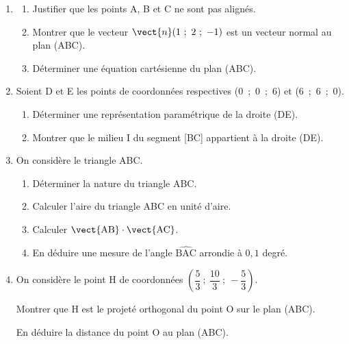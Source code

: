 \begin{enumerate}
\item 
	\begin{enumerate}
		\item Justifier que les points A, B et C ne sont pas alignés.
		\item Montrer que le vecteur $\vect{n}(1~;~2~;~-1)$ est
un vecteur normal au plan (ABC).
		\item Déterminer une équation cartésienne du plan (ABC).
	\end{enumerate}
\item Soient D et E les points de coordonnées respectives (0~;~0~;~6) et (6~;~6~;~0).
	\begin{enumerate}
		\item Déterminer une représentation paramétrique de la droite (DE).
		\item Montrer que le milieu I du segment [BC] appartient à la droite (DE).
	\end{enumerate}	
\item On considère le triangle ABC.
	\begin{enumerate}
		\item Déterminer la nature du triangle ABC.
		\item Calculer l'aire du triangle ABC en unité d'aire.
		\item Calculer $\vect{\text{AB}}  \cdot \vect{\text{AC}}$.
		\item En déduire une mesure de l'angle $\widehat{\text{BAC}}$ arrondie à $0,1$ degré.
	\end{enumerate}	
\item On considère le point H de coordonnées $\left(\dfrac53~;~\dfrac{10}{3}~;~- \dfrac53\right)$.

Montrer que H est le projeté orthogonal du point O sur le plan (ABC). 

En déduire la distance du point O au plan (ABC).
\end{enumerate}
